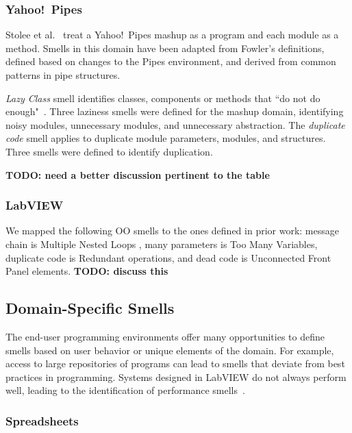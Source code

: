 \documentclass[10pt,conference,compsocconf]{IEEEtran}
\newcommand{\todo}[1]{\textbf{TODO: #1}}
\begin{document}
\subsubsection{Yahoo!\ Pipes}
Stolee et al.~\cite{Stolee2011, StoleeTSE2013} treat a Yahoo!\ Pipes mashup as a program and each module as a method. Smells in this domain have been adapted from Fowler's definitions, defined based on changes to the Pipes environment, and derived from common patterns in pipe structures. 


\emph{Lazy Class} smell identifies classes, components or methods that ``do not do enough"~\cite{Fowl1999}. Three laziness smells were defined for the mashup domain, identifying noisy modules, unnecessary modules, and unnecessary abstraction. The \emph{duplicate code} smell applies to duplicate module parameters, modules, and structures. Three smells were defined to identify duplication. 

\todo{need a better discussion pertinent to the table}

\subsubsection{LabVIEW}

We mapped the following OO smells to the ones defined in prior work\cite{chambers2013smell}: message chain is Multiple Nested Loops , many parameters is Too Many Variables, duplicate code is Redundant operations, and dead code is Unconnected Front Panel
elements. 
\todo{discuss this}

\subsection{Domain-Specific Smells}
The end-user programming environments offer many opportunities to define smells based on user behavior or unique elements of the domain. For example, access to large repositories of programs can lead to smells that deviate from best practices in programming. Systems designed in LabVIEW do not always perform well, leading to the identification of performance smells~\cite{chambers2013smell}. 

\subsubsection{Spreadsheets}
\end{document}
